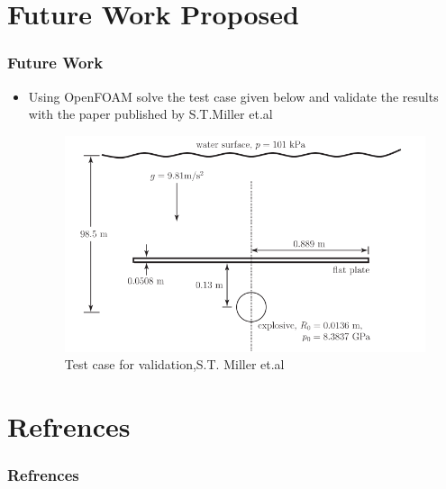 \documentclass{beamer}
\begin{document}

\section{Future Work Proposed}
\begin{frame}
\frametitle{Future Work}
\begin{itemize}
  \item Using OpenFOAM solve the test case given below and validate the results with the paper published by S.T.Miller et.al   
  \begin{figure}[h]  
  \begin{center}  
  \includegraphics[scale=0.35]{9.png}
  \caption{\tiny Test case for validation,S.T. Miller et.al }
  \end{center}  
\end{figure}
  
\end{itemize}
\end{frame}

\section{Refrences}
\begin{frame}
\frametitle{Refrences}
\end{frame}

\end{document}
